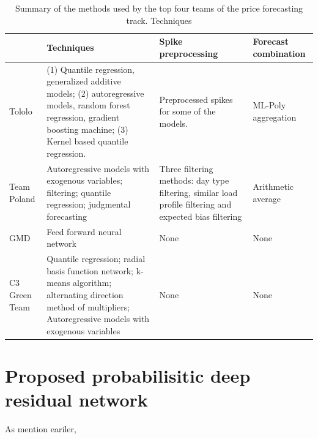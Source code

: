 \documentclass[review]{elsarticle}
\begin{document}
    \begin{table}[H]
      \caption{Summary of the methods used by the top four teams of the price forecasting track. Techniques}
      \label{table:GEFCOm2014}
      \begin{tabular}{p{2cm}p{5cm}p{3cm}p{3cm}}
      \hline
                             & Techniques                                                                                                                                                                  & Spike preprocessing                                                                                     & Forecast combination \\ \hline
      Tololo                 & (1) Quantile regression, generalized additive models; (2) autoregressive models, random forest regression, gradient boosting machine; (3) Kernel based quantile regression. & Preprocessed spikes for some of the models.                                                             & ML-Poly aggregation  \\
      Team Poland            & Autoregressive models with exogenous variables; filtering; quantile regression; judgmental forecasting                                                                      & Three filtering methods: day type filtering, similar load profile filtering and expected bias filtering & Arithmetic average   \\
      GMD                    & Feed forward neural network                                                                                                                                                 & None                                                                                                    & None                 \\
      C3 Green Team          & Quantile regression; radial basis function network; k-means algorithm; alternating direction method of multipliers; Autoregressive models with exogenous variables          & None                                                                                                    & None                 \\ \hline
      \end{tabular}

    \end{table}

\section{Proposed probabilisitic deep residual network}
  As mention eariler,
\end{document}
